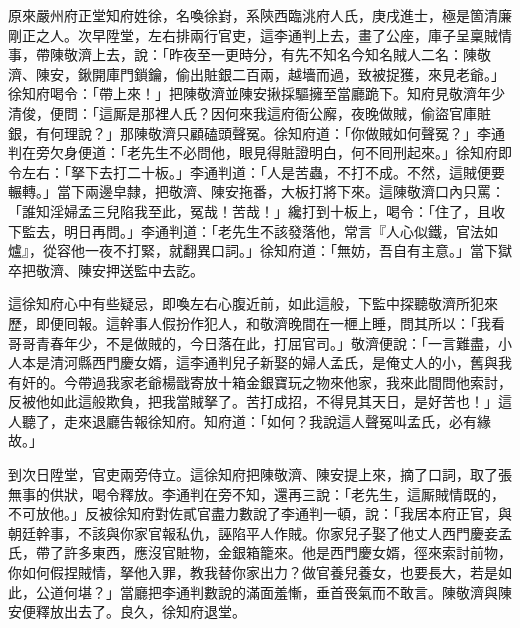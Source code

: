 原來嚴州府正堂知府姓徐，名喚徐崶，系陝西臨洮府人氏，庚戌進士，極是箇清廉剛正之人。次早陞堂，左右排兩行官吏，這李通判上去，畫了公座，庫子呈稟賊情事，帶陳敬濟上去，說：「昨夜至一更時分，有先不知名今知名賊人二名：陳敬濟、陳安，鍬開庫門鎖鑰，偷出賍銀二百兩，越墻而過，致被捉獲，來見老爺。」徐知府喝令：「帶上來！」把陳敬濟並陳安揪採驅擁至當廳跪下。知府見敬濟年少清俊，{}便問：「這厮是那裡人氏？因何來我這府衙公廨，夜晚做賊，偷盜官庫賍銀，有何理說？」那陳敬濟只顧磕頭聲冤。徐知府道：「你做賊如何聲冤？」李通判在旁欠身便道：「老先生不必問他，眼見得賍證明白，何不囘刑起來。」徐知府即令左右：「拏下去打二十板。」李通判道：「人是苦蟲，不打不成。不然，這賊便要輾轉。」當下兩邊皁隸，把敬濟、陳安拖番，大板打將下來。這陳敬濟口內只罵：「誰知淫婦孟三兒陷我至此，冤哉！苦哉！」{}{}纔打到十板上，喝令：「住了，且收下監去，明日再問。」李通判道：「老先生不該發落他，常言『人心似鐵，官法如爐』，從容他一夜不打緊，就翻異口詞。」徐知府道：「無妨，吾自有主意。」當下獄卒把敬濟、陳安押送監中去訖。

這徐知府心中有些疑忌，即喚左右心腹近前，如此這般，下監中探聽敬濟所犯來歷，{}即便囘報。這幹事人假扮作犯人，和敬濟晚間在一㭱上睡，問其所以：「我看哥哥青春年少，不是做賊的，今日落在此，打屈官司。」敬濟便說：「一言難盡，小人本是清河縣西門慶女婿，這李通判兒子新娶的婦人孟氏，是俺丈人的小，舊與我有奸的。今帶過我家老爺楊戩寄放十箱金銀寶玩之物來他家，我來此間問他索討，反被他如此這般欺負，把我當賊拏了。苦打成招，不得見其天日，是好苦也！」這人聽了，走來退廳告報徐知府。知府道：「如何？我說這人聲冤叫孟氏，必有緣故。」{}

到次日陞堂，官吏兩旁侍立。這徐知府把陳敬濟、陳安提上來，摘了口詞，取了張無事的供狀，喝令釋放。李通判在旁不知，還再三說：「老先生，這厮賊情既的，不可放他。」反被徐知府對佐貳官盡力數說了李通判一頓，說：「我居本府正官，與朝廷幹事，不該與你家官報私仇，誣陷平人作賊。你家兒子娶了他丈人西門慶妾孟氏，帶了許多東西，應沒官賍物，金銀箱籠來。他是西門慶女婿，徑來索討前物，你如何假捏賊情，拏他入罪，教我替你家出力？做官養兒養女，也要長大，若是如此，公道何堪？」{}當廳把李通判數說的滿面羞慚，垂首䘮氣而不敢言。陳敬濟與陳安便釋放出去了。良久，徐知府退堂。

